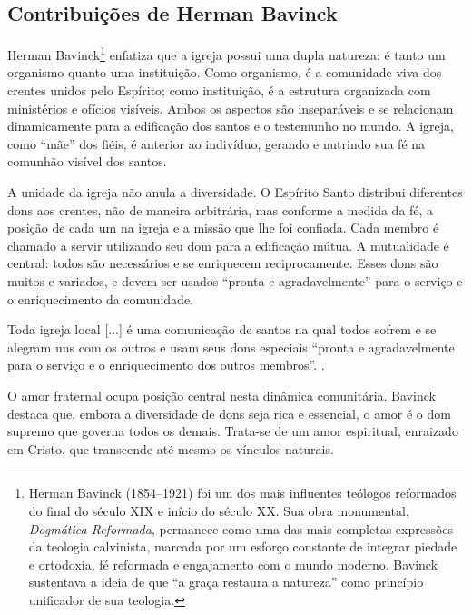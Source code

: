 \subsection{Contribuições de Herman Bavinck}

Herman Bavinck\footnote{Herman Bavinck (1854–1921) foi um dos mais influentes teólogos reformados do final do século XIX e início do século XX. Sua obra monumental, \textit{Dogmática Reformada}, permanece como uma das mais completas expressões da teologia calvinista, marcada por um esforço constante de integrar piedade e ortodoxia, fé reformada e engajamento com o mundo moderno. Bavinck sustentava a ideia de que ``a graça restaura a natureza'' como princípio unificador de sua teologia.} enfatiza que a igreja possui uma dupla natureza: é tanto um organismo quanto uma instituição. Como organismo, é a comunidade viva dos crentes unidos pelo Espírito; como instituição, é a estrutura organizada com ministérios e ofícios visíveis. Ambos os aspectos são inseparáveis e se relacionam dinamicamente para a edificação dos santos e o testemunho no mundo. A igreja, como ``mãe'' dos fiéis, é anterior ao indivíduo, gerando e nutrindo sua fé na comunhão visível dos santos.\cite{bavinck2012}

A unidade da igreja não anula a diversidade. O Espírito Santo distribui diferentes dons aos crentes, não de maneira arbitrária, mas conforme a medida da fé, a posição de cada um na igreja e a missão que lhe foi confiada.\cite{bavinck2012} Cada membro é chamado a servir utilizando seu dom para a edificação mútua. A mutualidade é central: todos são necessários e se enriquecem reciprocamente. Esses dons são muitos e variados, e devem ser usados ``pronta e agradavelmente'' para o serviço e o enriquecimento da comunidade.\cite{bavinck2012}

\begin{citacao}
Toda igreja local [...] é uma comunicação de santos na qual todos sofrem e se alegram uns com os outros e usam seus dons especiais ``pronta e agradavelmente para o serviço e o enriquecimento dos outros membros''. \cite[p.~380]{bavinck2012}.
\end{citacao}

O amor fraternal ocupa posição central nesta dinâmica comunitária. Bavinck destaca que, embora a diversidade de dons seja rica e essencial, o amor é o dom supremo que governa todos os demais\cite[p.~304]{bavinck2012}. Trata-se de um amor espiritual, enraizado em Cristo, que transcende até mesmo os vínculos naturais.\cite[p.~304]{bavinck2012}

